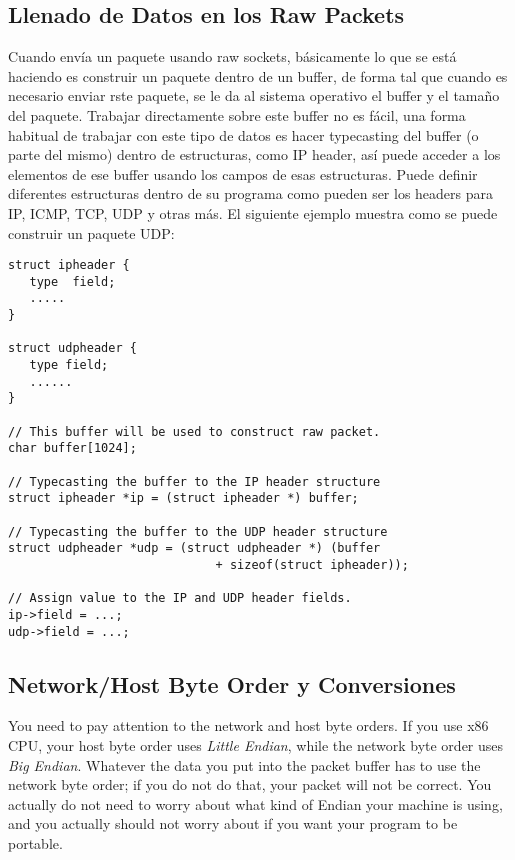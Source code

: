 \subsection{Llenado de Datos en los Raw Packets}

Cuando envía un paquete usando raw sockets, básicamente lo que se está haciendo es construir un paquete dentro de un buffer, de forma tal que cuando es necesario enviar rste paquete, se le da al sistema operativo el buffer y el tamaño del paquete. 
Trabajar directamente sobre este buffer no es fácil, una forma habitual de trabajar con este tipo de datos es hacer typecasting del buffer (o parte del mismo) dentro de estructuras, como IP header, así puede acceder a los elementos de ese buffer usando los campos de esas estructuras.
Puede definir diferentes estructuras dentro de su programa como pueden ser los headers para IP, ICMP, TCP, UDP y otras más. El siguiente ejemplo muestra como se puede construir un paquete UDP:

\begin{lstlisting}
struct ipheader {
   type  field;
   .....
}

struct udpheader {
   type field;
   ......
}

// This buffer will be used to construct raw packet.
char buffer[1024];

// Typecasting the buffer to the IP header structure
struct ipheader *ip = (struct ipheader *) buffer;

// Typecasting the buffer to the UDP header structure
struct udpheader *udp = (struct udpheader *) (buffer
                             + sizeof(struct ipheader));

// Assign value to the IP and UDP header fields.
ip->field = ...;
udp->field = ...;
\end{lstlisting}



\subsection{Network/Host Byte Order y Conversiones}


You need to pay attention to the network and host byte orders. If you use 
x86 CPU, your host byte order uses {\em Little Endian}, while 
the network byte order uses {\em Big Endian}. Whatever the data you put 
into the packet buffer has to use the network byte order; if you do not 
do that, your packet will not be correct. You actually do not need to worry
about what kind of Endian your machine is using, and you actually should not worry
about if you want your program to be portable. 


